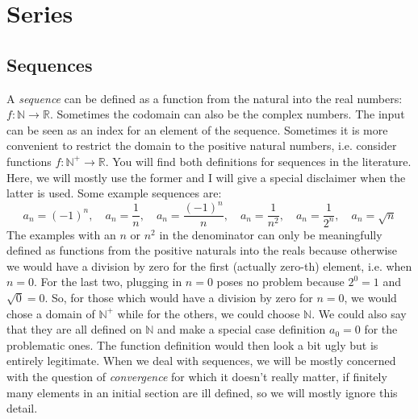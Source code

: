 \section{Series}





\subsection{Sequences}
A \emph{sequence} can be defined as a function from the natural into the real numbers: $f: \mathbb{N} \rightarrow \mathbb{R}$. Sometimes the codomain can also be the complex numbers. The input can be seen as an index for an element of the sequence. Sometimes it is more convenient to restrict the domain to the positive natural numbers, i.e. consider functions $f: \mathbb{N}^+ \rightarrow \mathbb{R}$. You will find both definitions for sequences in the literature. Here, we will mostly use the former and I will give a special disclaimer when the latter is used. Some example sequences are:
\begin{equation}
 a_n = (-1)^n,           \quad 
 a_n = \frac{1}{n},      \quad
 a_n = \frac{(-1)^n}{n}, \quad 
 a_n = \frac{1}{n^2},    \quad
 a_n = \frac{1}{2^n},    \quad  
 a_n = \sqrt{n}
\end{equation}
The examples with an $n$ or $n^2$ in the denominator can only be meaningfully defined as functions from the positive naturals into the reals because otherwise we would have a division by zero for the first (actually zero-th) element, i.e. when $n=0$. For the last two, plugging in $n=0$ poses no problem because $2^0=1$ and $\sqrt{0} = 0$. So, for those which would have a division by zero for $n=0$, we would chose a domain of $\mathbb{N}^+$ while for the others, we could choose $\mathbb{N}$. We could also say that they are all defined on $\mathbb{N}$ and make a special case definition $a_0 = 0$ for the problematic ones. The function definition would then look a bit ugly but is entirely legitimate. When we deal with sequences, we will be mostly concerned with the question of \emph{convergence} for which it doesn't really matter, if finitely many elements in an initial section are ill defined, so we will mostly ignore this detail. 

